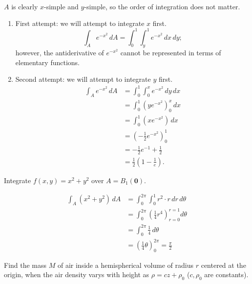 \begin{solution}
    $A$ is clearly $x$-simple and $y$-simple, 
    so the order of integration does not matter.
    \begin{enumerate}
        \item 
            First attempt: we will attempt to integrate $x$ first.
            \[
                \int_A e^{-x^2} \, dA = \int_0^1 \int_y^1 e^{-x^2} \, dx \, dy;
            \]
            however, the antiderivative of $e^{-x^2}$ cannot be represented
            in terms of elementary functions.

        \item Second attempt: we will attempt to integrate $y$ first.
            \begin{align*}
                \int_A e^{-x^2} \, dA
                &= \int_0^1 \int_0^x e^{-x^2} \, dy \, dx \\
                &= \int_0^1 \left(ye^{-x^2}\right)^x_0 \, dx \\
                &= \int_0^1 \left(xe^{-x^2}\right) \, dx \\
                &= \left(-\frac12e^{-x^2}\right)^1_0 \\
                &= -\frac12e^{-1} + \frac12 \\
                &= \frac12\left(1-\frac1e\right).
            \end{align*}
    \end{enumerate}
\end{solution}

\begin{example}
    Integrate $f(x, y) = x^2 + y^2$ over $A = B_1(\bm 0)$.
\end{example}

\begin{solution}
    \begin{align*}
        \int_A(x^2 + y^2) \, dA
        &= \int_0^{2\pi} \int_0^1 r^2 \cdot r \, dr \, d\theta \\
        &= \int_0^{2\pi} \left(\frac14r^4\right)^{r = 1}_{r = 0} d\theta \\
        &= \int_0^{2\pi} \frac14 \, d\theta \\
        &= \left(\frac14\theta\right)^{2\pi}_0 = \frac{\pi}2
    \end{align*}
\end{solution}

\begin{example}
    Find the mass $M$ of air inside a hemispherical volume
    of radius $r$ centered at the origin, when the air density
    varys with height as $\rho = cz + \rho_0$ 
    ($c, \rho_0$ are constants).
\end{example}

